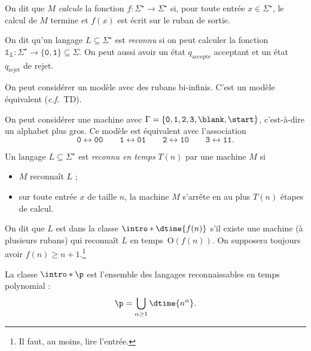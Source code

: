 \documentclass[./main]{subfiles}
\begin{document}
  \begin{defn}
    On dit que $M$ \textit{calcule} la fonction $f : \Sigma^\star \to \Sigma^\star$ si, pour toute entrée $x \in \Sigma^\star$, le calcul de $M$ termine et $f(x)$ est écrit sur le ruban de sortie.

    On dit qu'un langage $L \subseteq \Sigma^\star$ est \textit{reconnu} si on peut calculer la fonction $\mathds{1}_L : \Sigma^\star \to \{\texttt{0}, \texttt{1}\} \subseteq \Sigma$.
    On peut aussi avoir un état $q_\text{accepte}$ acceptant et un état $q_\text{rejet}$ de rejet.
  \end{defn}

  \begin{rmk}[Variantes]
    On peut considérer un modèle avec des rubans bi-infinis. C'est un modèle équivalent (\textit{c.f.}\ TD).

    On peut considérer une machine avec $\Gamma = \{\texttt{0}, \texttt{1}, \texttt{2}, \texttt{3}, \blank, \start\}$, c'est-à-dire un alphabet plus gros. Ce modèle est équivalent avec l'association 
    \[
      \texttt{0} \leftrightarrow \texttt{00} \quad\quad \texttt{1} \leftrightarrow \texttt{01} \quad\quad \texttt{2} \leftrightarrow \texttt{10} \quad\quad \texttt{3} \leftrightarrow \texttt{11}
    .\]
  \end{rmk}


  \begin{defn}
    Un langage $L \subseteq \Sigma^\star$ est \textit{reconnu en temps} $T(n)$ par une machine $M$ si
    \begin{itemize}
      \item $M$ reconnaît $L$ ;
      \item sur toute entrée $x$ de taille $n$, la machine $M$ s'arrête en au plus $T(n)$ étapes de calcul.
    \end{itemize}
  \end{defn}

  \begin{defn}
    On dit que $L$ est dans la classe $\intro * \dtime{f(n)}$ s'il existe une machine (à plusieurs rubans) qui reconnaît $L$ en temps~$\mathrm{O}(f(n))$.
    On supposera toujours avoir $f(n) \ge n + 1$.\footnote{Il faut, au moins, lire l'entrée.}
  \end{defn}

  \begin{defn}
    La classe $\intro*\p$ est l'ensemble des langages reconnaissables en temps polynomial :
     \[
       \p = \bigcup_{\alpha \ge 1} \dtime{n^\alpha}
    .\]
  \end{defn}
\end{document}
